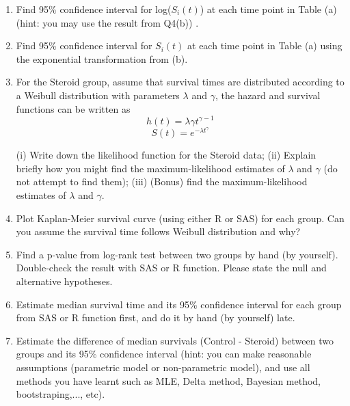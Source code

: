\begin{enumerate}
\begin{enumerate}
\vspace{1cm}

\item Find 95\% confidence interval for log($S_i (t)$) at each time point in Table (a) (hint: you may use the result from Q4(b)) .
\item Find 95\% confidence interval for $S_i (t)$ at each time point in Table (a) using the exponential transformation from (b).
\item For the Steroid group, assume that survival times are distributed according to a Weibull distribution with parameters $\lambda$ and $\gamma$, the hazard and survival functions can be written as
$$
h(t) = \lambda \gamma t^{\gamma -1}
$$
$$
S(t) = e^{-\lambda t^{\gamma}}
$$

(i) Write down the likelihood function for the Steroid data; (ii) Explain briefly how you might find the maximum-likelihood estimates of $\lambda$ and $\gamma$ (do not attempt to find them); (iii) (Bonus) find the maximum-likelihood estimates of $\lambda$ and $\gamma$.
\item Plot Kaplan-Meier survival curve (using either R or SAS) for each group. Can you assume the survival time follows Weibull distribution and why?   
\item Find a p-value from log-rank test between two groups by hand (by yourself). Double-check the result with SAS or R function. Please state the null and alternative hypotheses.
\item Estimate median survival time and its 95\% confidence interval for each group from SAS or R function first, and do it by hand (by yourself) late.
\item Estimate the difference of median survivals (Control - Steroid) between two groups and its 95\% confidence interval (hint: you can make reasonable assumptions (parametric model or non-parametric model), and use all methods you have learnt such as MLE, Delta method, Bayesian method, bootstraping,..., etc). 

\end{enumerate}




\end{enumerate}









